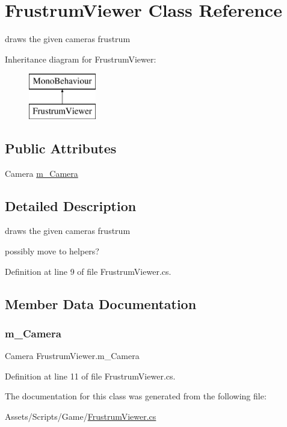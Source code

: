 \hypertarget{class_frustrum_viewer}{}\section{Frustrum\+Viewer Class Reference}
\label{class_frustrum_viewer}


draws the given cameras\textquotesingle{} frustrum  


Inheritance diagram for Frustrum\+Viewer\+:\begin{figure}[H]
\begin{center}
\leavevmode
\includegraphics[height=2.000000cm]{class_frustrum_viewer}
\end{center}
\end{figure}
\subsection*{Public Attributes}
\begin{DoxyCompactItemize}
\item 
Camera \mbox{\hyperlink{class_frustrum_viewer_a939fe9e650d5f5def8f6fd333fecdc3a}{m\+\_\+\+Camera}}
\end{DoxyCompactItemize}


\subsection{Detailed Description}
draws the given cameras\textquotesingle{} frustrum 

possibly move to helpers? 

Definition at line 9 of file Frustrum\+Viewer.\+cs.



\subsection{Member Data Documentation}
\mbox{\label{class_frustrum_viewer_a939fe9e650d5f5def8f6fd333fecdc3a}} 
\subsubsection{\texorpdfstring{m\+\_\+\+Camera}{m\_Camera}}
{\footnotesize\ttfamily Camera Frustrum\+Viewer.\+m\+\_\+\+Camera}



Definition at line 11 of file Frustrum\+Viewer.\+cs.



The documentation for this class was generated from the following file\+:\begin{DoxyCompactItemize}
\item 
Assets/\+Scripts/\+Game/\mbox{\hyperlink{_frustrum_viewer_8cs}{Frustrum\+Viewer.\+cs}}\end{DoxyCompactItemize}
